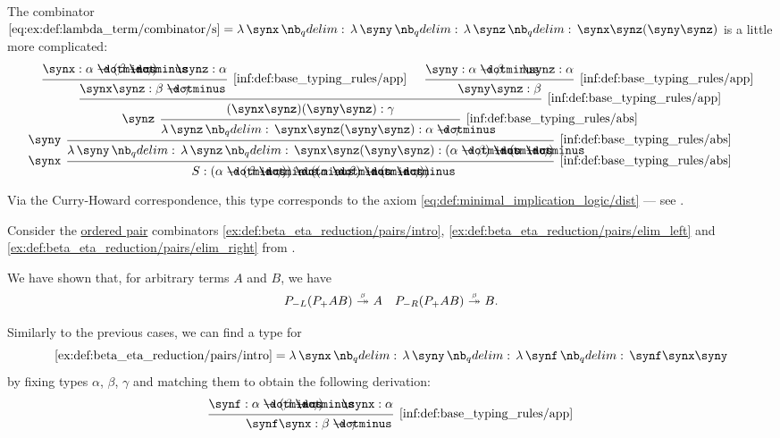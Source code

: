 \begin{example}
\begin{thmenum}
     The combinator \( \ref{eq:ex:def:lambda_term/combinator/s} = \qabs \synx \qabs \syny \qabs \synz \synx \synz (\syny \synz) \) is a little more complicated:
    \begin{equation*}
      \begin{prooftree}
        \hypo{ \synx: \alpha \synimplies (\beta \synimplies \gamma) }
        \hypo{ \synz: \alpha }
        \infer2[\ref{inf:def:base_typing_rules/app}]{ \synx \synz: \beta \synimplies \gamma }

        \hypo{ \syny: \alpha \synimplies \beta }
        \hypo{ \synz: \alpha }
        \infer2[\ref{inf:def:base_typing_rules/app}]{ \syny \synz: \beta }

        \infer2[\ref{inf:def:base_typing_rules/app}]{ (\synx \synz) (\syny \synz): \gamma }
        \infer[left label=\( \synz \)]1[\ref{inf:def:base_typing_rules/abs}]{ \qabs \synz \synx \synz (\syny \synz): \alpha \synimplies \gamma }
        \infer[left label=\( \syny \)]1[\ref{inf:def:base_typing_rules/abs}]{ \qabs \syny \qabs \synz \synx \synz (\syny \synz): (\alpha \synimplies \beta) \synimplies (\alpha \synimplies \gamma) }
        \infer[left label=\( \synx \)]1[\ref{inf:def:base_typing_rules/abs}]{ S: (\alpha \synimplies (\beta \synimplies \gamma)) \synimplies ((\alpha \synimplies \beta) \synimplies (\alpha \synimplies \gamma)) }
      \end{prooftree}
    \end{equation*}

    Via the Curry-Howard correspondence, this type corresponds to the axiom \eqref{eq:def:minimal_implication_logic/dist} --- see .

     Consider the \hyperref[def:ordered_tuple]{ordered pair} combinators \ref{ex:def:beta_eta_reduction/pairs/intro}, \ref{ex:def:beta_eta_reduction/pairs/elim_left} and \ref{ex:def:beta_eta_reduction/pairs/elim_right} from .

    We have shown that, for arbitrary terms \( A \) and \( B \), we have
    \begin{align*}
      P_{-L} (P_+ A B) \bred* A
      &&
      P_{-R} (P_+ A B) \bred* B.
    \end{align*}

    Similarly to the previous cases, we can find a type for
    \begin{equation*}
      \ref{ex:def:beta_eta_reduction/pairs/intro} = \qabs \synx \qabs \syny \qabs \synf \synf \synx \syny
    \end{equation*}
    by fixing types \( \alpha \), \( \beta \), \( \gamma \) and matching them to obtain the following derivation:
    \begin{equation*}
      \begin{prooftree}
        \hypo{ \synf: \alpha \synimplies (\beta \synimplies \gamma) }
        \hypo{ \synx: \alpha }
        \infer2[\ref{inf:def:base_typing_rules/app}]{ \synf \synx: \beta \synimplies \gamma }


\end{prooftree}
\end{equation*}
\end{thmenum}
\end{example}
